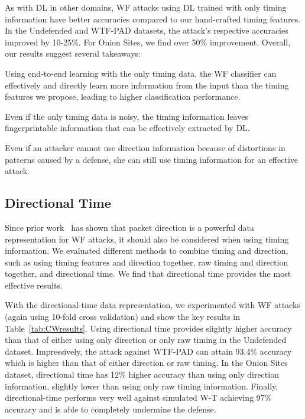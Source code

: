 \documentclass[USenglish,oneside,twocolumn]{article}
\newenvironment{smitemize}
  {\begin{list}{--}
     {\setlength{\parsep}{0pt}
      \setlength{\leftmargin}{15pt}
      \setlength{\topsep}{-2pt}
      \setlength{\labelwidth}{5pt}
      \setlength{\itemsep}{1pt}}}
  {\end{list}}
\begin{document}
As with DL in other domains, WF attacks using DL trained with only timing information have better accuracies compared to our hand-crafted timing features. In the Undefended and WTF-PAD datasets, the attack's respective accuracies improved by 10-25\%. For Onion Sites, we find over 50\% improvement. Overall, our results suggest several takeaways:
~\begin{smitemize}
    \item Using end-to-end learning with the only timing data, the WF classifier can effectively and directly learn more information from the input than the timing features we propose, leading to higher classification performance. 
    \item Even if the only timing data is noisy, the timing information leaves fingerprintable information that can be effectively extracted by DL.
    \item Even if an attacker cannot use direction information because of distortions in patterns caused by a defense, she can still use timing information for an effective attack.
\end{smitemize}



\subsection{Directional Time}
\label{directionaltiming}

Since prior work~\cite{abe2016fingerprinting, Rimmer2018, Sirinam2018} has shown that packet direction is a powerful data representation for WF attacks, it should also be considered when using timing information. We evaluated different methods to combine timing and direction, such as using timing features and direction together, raw timing and direction together, and directional time. We find that directional time provides the most effective results. 

With the directional-time data representation, we experimented with WF attacks (again using 10-fold cross validation) and show the key results in Table~\ref{tab:CWresults}. Using directional time provides slightly higher accuracy than that of either using only direction or only raw timing in the Undefended dataset. Impressively, the attack against WTF-PAD can attain 93.4\% accuracy which is higher than that of either direction or raw timing. In the Onion Sites dataset, directional time has 12\% higher accuracy than using only direction information, slightly lower than using only raw timing information. Finally, directional-time performs very well against simulated W-T achieving 97\% accuracy and is able to completely undermine the defense.
\end{document}

